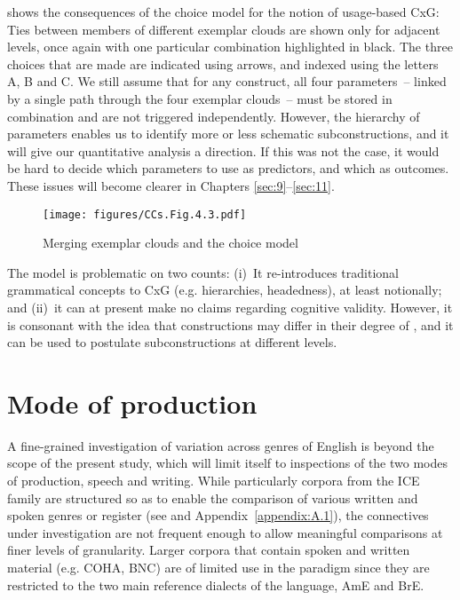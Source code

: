  shows the consequences of the choice model for the notion of usage-based CxG: Ties between members of different exemplar clouds are shown only for adjacent levels, once again with one particular combination highlighted in black. The three choices that are made are indicated using arrows, and indexed using the letters A, B and C. We still assume that for any construct, all four parameters~– linked by a single path through the four exemplar clouds~– must be stored in combination and are not triggered independently. However, the hierarchy of parameters enables us to identify more or less schematic subconstructions, and it will give our quantitative analysis a direction. If this was not the case, it would be hard to decide which parameters to use as predictors, and which as outcomes. These issues will become clearer in Chapters \ref{sec:9}–\ref{sec:11}.

\begin{figure}
\texttt{[image: figures/CCs.Fig.4.3.pdf]}
\caption{\label{bkm:Ref35430401}\label{fig:4.3}Merging exemplar clouds and the choice model}
\end{figure}

The model is problematic on two counts:
(i)~It re-introduces traditional grammatical concepts to CxG (e.g. hierarchies, headedness), at least notionally; and
(ii)~it can at present make no claims regarding cognitive validity. However, it is consonant with the idea that constructions may differ in their degree of , and it can be used to postulate subconstructions at different levels.

\pagebreak\section{\label{bkm:Ref89705747}\label{bkm:Ref89705748}\label{bkm:Ref89705749}\label{bkm:Ref485629936}Mode of production}\label{sec:4.2}

A fine-grained investigation of variation across genres of English is beyond the scope of the present study, which will limit itself to inspections of the two modes of production, speech and writing. While particularly corpora from the ICE family are structured so as to enable the comparison of various written and spoken genres or register (see  and Appendix~\ref{appendix:A.1}), the connectives under investigation are not frequent enough to allow meaningful comparisons at finer levels of granularity. Larger corpora that contain spoken and written material (e.g. COHA, BNC) are of limited use in the  paradigm since they are restricted to the two main reference dialects of the language, AmE and BrE.

